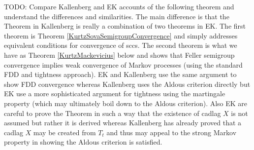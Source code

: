 TODO: Compare Kallenberg and EK accounts of the following theorem and understand the differences and similarities.  The main difference is that the Theorem in Kallenberg is really
a combination of two theorems in EK.  The first theorem is Theorem \ref{KurtzSovaSemigroupConvergence} and simply addresses equivalent conditions for convergence of sccs.  The second theorem is what we have as Theorem \ref{KurtzMackevicius} below and shows that Feller semigroup convergence implies weak convergence of Markov processes (using the standard FDD and tightness approach).  EK and Kallenberg use the same argument to show FDD convergence whereas Kallenberg uses the Aldous criterion directly but EK use a more sophisticated argument for tightness using the martingale property (which may ultimately boil down to the Aldous criterion).  Also EK are careful to prove the Theorem in such a way that the existence of cadlag $X$ is not assumed but rather it is derived whereas Kallenberg has already proved that a cadlag $X$ may be created from $T_t$ and thus may appeal to the strong Markov property in showing the Aldous criterion is satisfied.

